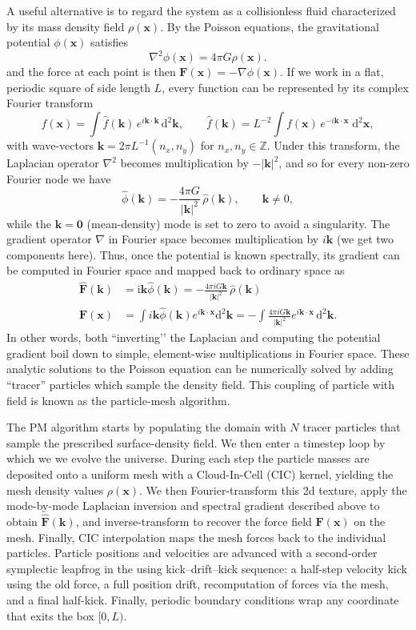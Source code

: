 \documentclass{lkx_paper}
\begin{document}
A useful alternative is to regard the system as a collisionless fluid characterized by its mass density field $\rho(\bm{x})$. By the Poisson equations, the gravitational potential $\phi(\bm{x})$ satisfies
\[
  \nabla^{2}\phi(\bm{x}) 
  = 4\pi G\rho(\bm{x}).
\]
and the force at each point is then $\bm{F}(\bm{x})=-\nabla\phi(\bm{x})$.
If we work in a flat, periodic square of side length \(L\), every function can be represented by its complex Fourier transform
\[
  f(\bm{x}) = \int \hat{f}(\bm{k})\,e^{i\bm{k}\cdot\bm{k}}\, \mathrm{d}^2 \bm{k},
  \qquad
  \hat{f}(\bm{k}) = L^{-2}\int
  f(\bm{x})\,e^{-i\bm{k}\cdot\bm{x}}\;\mathrm{d}^{2}\bm{x},
\]
with wave-vectors
$\bm{k}= 2\pi L^{-1}(n_{x},n_{y})$ for $n_{x},n_{y}\in\mathbb{Z}$.
Under this transform, the Laplacian operator $\nabla^2$ becomes multiplication by $-|\bm{k}|^2$, and so for every non-zero Fourier node we have
\[
  \hat{\phi}(\bm{k}) = -\frac{4\pi G}{\lvert\bm{k}\rvert^{2}}\,
  \hat{\rho}(\bm{k}),
  \qquad
  \bm{k}\neq 0,
\]
while the \(\bm{k}=\bm{0}\) (mean-density) mode is set to zero to avoid a singularity.
The gradient operator $\nabla$ in Fourier space becomes multiplication by $i\bm{k}$ (we get two components here). Thus, once the potential is known spectrally, its gradient can be computed in Fourier space and mapped back to ordinary space as
\[
  \begin{aligned}
  \widehat{\bm{F}}(\bm{k})
  &= \mathrm{i}\bm{k}\hat{\phi}(\bm{k})
  =-\frac{4\pi i G\bm{k}}{\lvert\bm{k}\rvert^{2}}\,
  \hat{\rho}(\bm{k})\\
  \bm{F}(\bm{x}) 
  &= 
  \int i\bm{k}\widehat{\phi}(\bm{k})e^{i\bm{k}\cdot \bm{x}}\mathrm{d}^2\bm{k}
  =-\int \frac{4\pi i G\bm{k}}{\lvert\bm{k}\rvert^{2}} e^{i\bm{k}\cdot \bm{x}}\,\mathrm{d}^2\bm{k}
  .
\end{aligned}
\]
In other words, both ``inverting’’ the Laplacian and computing the potential gradient boil down to simple, element-wise multiplications in Fourier space. 
These analytic solutions to the Poisson equation can be numerically solved by adding ``tracer'' particles which sample the density field. This coupling of particle with field is known as the particle-mesh algorithm.

The PM algorithm starts by populating the domain with $N$ tracer particles that sample the prescribed surface-density field. We then enter a timestep loop by which we we evolve the universe.
During each step the particle masses are deposited onto a
uniform mesh with a Cloud-In-Cell (CIC) kernel,
yielding the mesh density values $\rho(\bm{x})$.
We then Fourier-transform this 2d texture, apply the
mode-by-mode Laplacian inversion and spectral gradient described above to obtain
$\widehat{\bm{F}}(\bm{k})$, and inverse-transform to recover
the force field $\bm{F}(\bm{x})$ on the mesh.
Finally, CIC interpolation maps the mesh forces back to the individual particles.
Particle positions and velocities are advanced with a
second-order symplectic leapfrog in the using kick–drift–kick sequence:
a half-step velocity kick using the old force, a full position drift,
recomputation of forces via the mesh, and a final half-kick.
Finally, periodic boundary conditions wrap any coordinate that exits the box \([0,L)\).
\end{document}
